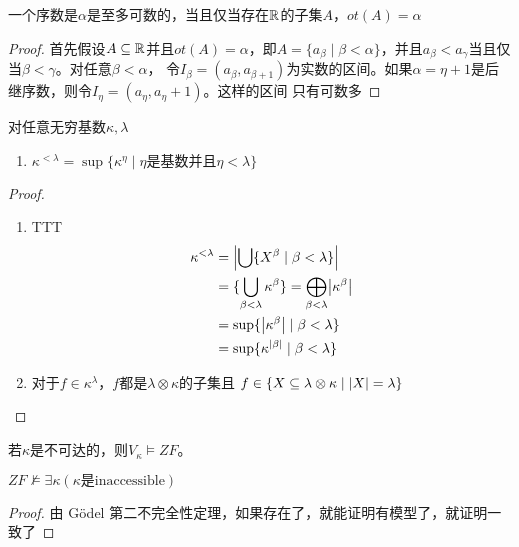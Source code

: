\documentclass[11pt]{article}
\begin{document}
\begin{theorem}[]
一个序数是\(\alpha\)是至多可数的，当且仅当存在\(\mathbb{R}\)的子集\(A\)，\(ot(A)=\alpha\)
\end{theorem}

\begin{proof}
首先假设\(A\subseteq\mathbb{R}\)并且\(ot(A)=\alpha\)，即\(A=\{a_\beta\mid\beta<\alpha\}\)，并且\(a_\beta<a_\gamma\)当且仅当\(\beta<\gamma\)。对任意\(\beta<\alpha\)，
令\(I_\beta=(a_\beta,a_{\beta+1})\)为实数的区间。如果\(\alpha=\eta+1\)是后继序数，则令\(I_\eta=(a_\eta,a_\eta+1)\)。这样的区间
只有可数多
\end{proof}

\begin{proposition}[2.2.15]
对任意无穷基数\(\kappa,\lambda\)
\begin{enumerate}
\item \(\kappa^{<\lambda}=\sup\{\kappa^\eta\mid\eta\text{是基数并且}\eta<\lambda\}\)
\end{enumerate}
\end{proposition}

\begin{proof}
\begin{enumerate}
\item TTT
\begin{align*}
\kappa^{<\lambda}&=\abs{\bigcup\{X^\beta\mid\beta<\lambda\}}\\
&=\{\bigcup_{\beta<\lambda}\kappa^\beta\}=\bigoplus_{\beta<\lambda}\abs{\kappa^\beta}\\
&=\sup\{\abs{\kappa^\beta}\mid\beta<\lambda\}\\
&=\sup\{\kappa^{\abs{\beta}}\mid\beta<\lambda\}
\end{align*}
\item 对于\(f\in\kappa^\lambda\)，\(f\)都是\(\lambda\otimes\kappa\)的子集且 \(f\in\{X\subseteq\lambda\otimes\kappa\mid\abs{X}=\lambda\}\)
\end{enumerate}
\end{proof}

\begin{exercise}
若\(\kappa\)是不可达的，则\(V_\kappa\vDash ZF\)。
\end{exercise}

\begin{corollary}[]
\(ZF\not\vDash\exists\kappa(\kappa\text{是inaccessible})\)
\end{corollary}

\begin{proof}
由 Gödel 第二不完全性定理，如果存在了，就能证明有模型了，就证明一致了
\end{proof}
\end{document}
